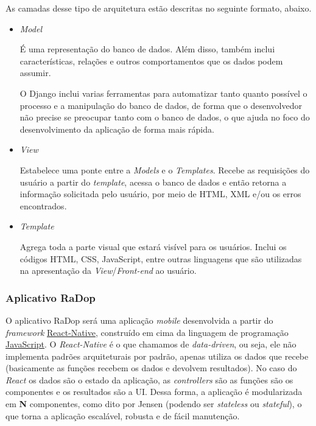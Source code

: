 As camadas desse tipo de arquitetura estão descritas no seguinte formato, abaixo.

\begin{itemize}



\item{\emph{Model}}\label{model}

É uma representação do banco de dados. Além disso, também inclui características, relações e outros comportamentos que os dados podem assumir.

O Django inclui varias ferramentas para automatizar tanto quanto possível o processo e a manipulação do banco de dados, de forma que o desenvolvedor não precise se preocupar tanto com o banco de dados, o que ajuda no foco do desenvolvimento da aplicação de forma mais rápida.

\item{\emph{View}}\label{view}

Estabelece uma ponte entre a \emph{Models} e o \emph{Templates}. Recebe as requisições do usuário a partir do \emph{template}, acessa o banco de dados e então retorna a informação solicitada pelo usuário, por meio de HTML, XML e/ou os erros encontrados.

\item{\emph{Template}}\label{template}

Agrega toda a parte visual que estará visível para os usuários. Inclui os códigos HTML, CSS, JavaScript, entre outras linguagens que são utilizadas na apresentação da \emph{View}/\emph{Front-end} ao usuário.

\end{itemize}


\subsubsection{Aplicativo RaDop}\label{aplicativo-radop}

O aplicativo RaDop será uma aplicação \emph{mobile} desenvolvida a partir do \emph{framework} \href{https://facebook.github.io/react-native/}{React-Native}, construído em cima da linguagem de programação \href{https://www.javascript.com/}{JavaScript}. O \emph{React-Native} é o que chamamos de \emph{data-driven}, ou seja, ele não implementa padrões arquiteturais por padrão, apenas utiliza os dados que recebe (basicamente as funções recebem os dados e devolvem resultados). No caso do \emph{React} os dados são o estado da aplicação, as \emph{controllers} são as funções são os componentes e os resultados são a UI. Dessa forma, a aplicação é modularizada em \textbf{N} componentes, como dito por Jensen \cite{jensen2018} (podendo ser \emph{stateless} ou \emph{stateful}), o que torna a aplicação escalável, robusta e de fácil manutenção.

